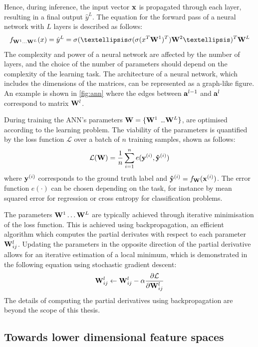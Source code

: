 		Hence, during inference, the input vector $\mathbf{x}$ is propagated through each layer, resulting in a final output $\hat{y}^L$. The equation for the forward pass of a neural network with $L$ layers is described as follows: 	
		$$
			f_{\W^1 \dots \W^L}(x) = \hat{y}^L = \sigma(… \sigma( \sigma( x^T \W^1 )^T) \W^2 …)^T \W^L \label{eq:forward_pass}
		$$
		The complexity and power of a neural network are affected by the number of layers, and the choice of the number of parameters should depend on the complexity of the learning task. The architecture of a neural network, which includes the dimensions of the matrices, can be represented as a graph-like figure. An example is shown in \ref{fig:ann} where the edges between $\mathbf{a}^{l-1}$ and $\mathbf{a}^{l}$ correspond to matrix $\mathbf{W}^l$.

		

	
		During training the ANN's parameters $\mathbf{W} = \{\mathbf{W}^1$ \dots $\mathbf{W}^L\}$, are optimised according to the learning problem. The viability of the parameters is quantified by the loss function $\mathcal{L}$ over a batch of $n$ training samples, shown as follows:
		$$
			\mathcal{L}(\mathbf{W}) = \frac{1}{n}\sum_{i=1}^n e(\mathbf{y}^{(i)}, \mathbf{\hat{y}}^{(i)}) \label{eq:generic_loss}
		$$
		where $\mathbf{y}^{(i)}$ corresponds to the ground truth label and $\mathbf{\hat{y}}^{(i)} = f_{\mathbf{W}}(\mathbf{x}^{(i)})$. The error function $e(\cdot)$ can be chosen depending on the task, for instance by mean squared error for regression or cross entropy for classification problems.
		
		The parameters $\mathbf{W}^1 \dots \mathbf{W}^L$ are typically achieved through iterative minimisation of the loss function. This is achieved using backpropagation, an efficient algorithm which computes the partial derivates with respect to each parameter $\mathbf{W}^l_{ij}$. Updating the parameters in the opposite direction of the partial derivative allows for an iterative estimation of a local minimum, which is demonstrated in the following equation using stochastic gradient descent:
		$$
			\mathbf{W}^l_{ij} \leftarrow \mathbf{W}^l_{ij} - \alpha \frac{\partial \mathcal{L}}{\partial \mathbf{W}^l_{ij}}
		$$
		The details of computing the partial derivatives using backpropagation are beyond the scope of this thesis.

	
	\subsection{Towards lower dimensional feature spaces}
	
